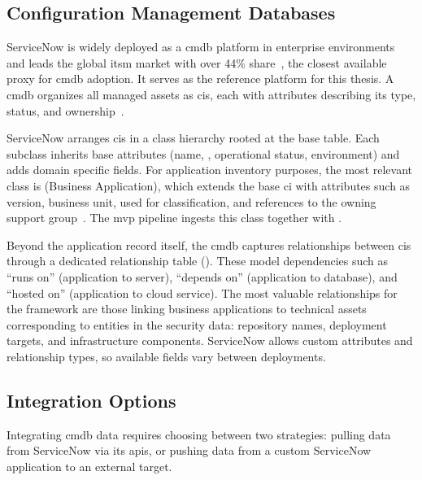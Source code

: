
\subsection{Configuration Management Databases}

ServiceNow is widely deployed as a \gls{cmdb} platform in enterprise environments and leads the global \gls{itsm} market with over 44\% share~\cite{Gartner2024ITSM}, the closest available proxy for \gls{cmdb} adoption. It serves as the reference platform for this thesis. A \gls{cmdb} organizes all managed assets as \glspl{ci}, each with attributes describing its type, status, and ownership~\cite{AXELOS2019}.

ServiceNow arranges \glspl{ci} in a class hierarchy rooted at the  base table. Each subclass inherits base attributes (name, , operational status, environment) and adds domain specific fields. For application inventory purposes, the most relevant class is  (Business Application), which extends the base \gls{ci} with attributes such as version, business unit, used for classification, and references to the owning support group~\cite{ServiceNowCMDB2024}. The \gls{mvp} pipeline ingests this class together with .

Beyond the application record itself, the \gls{cmdb} captures relationships between \glspl{ci} through a dedicated relationship table (). These model dependencies such as ``runs on'' (application to server), ``depends on'' (application to database), and ``hosted on'' (application to cloud service). The most valuable relationships for the framework are those linking business applications to technical assets corresponding to entities in the security data: repository names, deployment targets, and infrastructure components. ServiceNow allows custom attributes and relationship types, so available fields vary between deployments.


\subsection{Integration Options}

Integrating \gls{cmdb} data requires choosing between two strategies: pulling data from ServiceNow via its \glspl{api}, or pushing data from a custom ServiceNow application to an external target.

